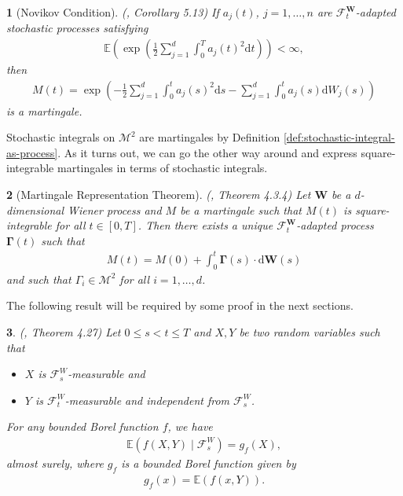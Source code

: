 \documentclass[english]{article}
\numberwithin{equation}{section}
\numberwithin{figure}{section}
\theoremstyle{bolddescit}
\newtheorem{theorem}{\protect\theoremname}[section]
\theoremstyle{definition}
\theoremstyle{definition}
\theoremstyle{plain}
\theoremstyle{plain}
\theoremstyle{bolddesc}
\theoremstyle{plain}
\theoremstyle{remark}
\providecommand{\theoremname}{Theorem}
\begin{document}
\begin{theorem}[Novikov Condition]\label{thm:novikov}
  (\cite{karatzas_brownian_1998}, Corollary 5.13)
  If $a_j(t)$, $j=1,\ldots,n$ are $\mathcal{F}^\mathbf{W}_t$-adapted stochastic processes satisfying
  \begin{align*}
    \mathbb{E}\left(\exp \left(\frac{1}{2} \sum_{j=1}^d \int_0^T a_j(t)^2 \mathrm{d}t\right)\right) < \infty,
  \end{align*}
  then
  \begin{align*}
    M(t) = \exp \left( - \frac{1}{2} \sum_{j=1}^{d} \int_0^t a_j(s)^2 \mathrm{d}s - \sum_{j=1}^{d} \int_0^t a_j(s) \mathrm{d}W_j(s) \right)
  \end{align*}
  is a martingale.
\end{theorem}

Stochastic integrals on $\mathcal{M}^2$ are martingales by Definition \ref{def:stochastic-integral-as-process}. As it turns out, we can go the other way around and express square-integrable martingales in terms of stochastic integrals.

\begin{theorem}[Martingale Representation Theorem]\label{thm:martingale-representation}
  (\cite{oksendal_stochastic_2003}, Theorem 4.3.4)
  Let $\mathbf{W}$ be a $d$-dimensional Wiener process and $M$ be a martingale such that $M(t)$ is square-integrable for all $t \in [0,T]$. Then there exists a unique $\mathcal{F}^\mathbf{W}_t$-adapted process $\mathbf{\Gamma}(t)$ such that
  \begin{align*}
    M(t) = M(0) + \int_0^t \mathbf{\Gamma}(s) \cdot \mathrm{d}\mathbf{W}(s)
  \end{align*}
  and such that $\Gamma_i \in \mathcal{M}^2$ for all $i=1,\ldots,d$.
\end{theorem}

The following result will be required by some proof in the next sections.

\begin{theorem}\label{thm:cond-exp-measurable-independent}
  (\cite{kopp_probability_2013}, Theorem 4.27)
  Let $0 \le s < t \le T$ and $X, Y$ be two random variables such that
  \begin{itemize}
    \item $X$ is $\mathcal{F}^W_s$-measurable and
    \item $Y$ is $\mathcal{F}^W_t$-measurable and independent from $\mathcal{F}^W_s$.
  \end{itemize}
  For any bounded Borel function $f$, we have
  \begin{align*}
    \mathbb{E}(f(X,Y) \mid \mathcal{F}^W_s) = g_f(X),
  \end{align*}
  almost surely, where $g_f$ is a bounded Borel function given by
  \begin{align*}
    g_f(x) = \mathbb{E}(f(x,Y)).
  \end{align*}
\end{theorem}
\end{document}
